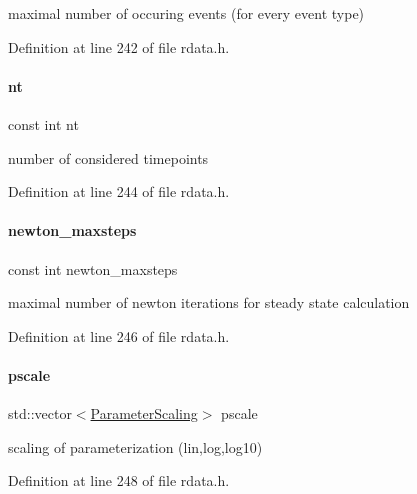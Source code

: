 maximal number of occuring events (for every event type) 

Definition at line 242 of file rdata.\+h.

\mbox{\label{classamici_1_1_return_data_a21dcbe77c07eeefce79fcacdbe5f1262}} 
\paragraph{\texorpdfstring{nt}{nt}}
{\footnotesize\ttfamily const int nt}

number of considered timepoints 

Definition at line 244 of file rdata.\+h.

\mbox{\label{classamici_1_1_return_data_a871e64bbfbd5881a86f21aaff42c3dec}} 
\paragraph{\texorpdfstring{newton\+\_\+maxsteps}{newton\_maxsteps}}
{\footnotesize\ttfamily const int newton\+\_\+maxsteps}

maximal number of newton iterations for steady state calculation 

Definition at line 246 of file rdata.\+h.

\mbox{\label{classamici_1_1_return_data_a5d1c7237dc998202fe1b3393b50f77ce}} 
\paragraph{\texorpdfstring{pscale}{pscale}}
{\footnotesize\ttfamily std\+::vector$<$\mbox{\hyperlink{namespaceamici_a42f062082226e9284c201d9eab71a3a0}{Parameter\+Scaling}}$>$ pscale}

scaling of parameterization (lin,log,log10) 

Definition at line 248 of file rdata.\+h.

